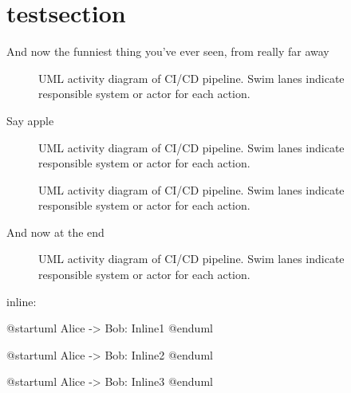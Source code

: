 \section{testsection}


And now the funniest thing you've ever seen, from really far away
\begin{figure} [H]
    \caption{UML activity diagram of CI/CD pipeline. Swim lanes indicate responsible system or actor for each action.}
    \label{test-diagram0}
\end{figure}
Say apple
\begin{figure} [H]
    \caption{UML activity diagram of CI/CD pipeline. Swim lanes indicate responsible system or actor for each action.}
    \label{cicd-diagram}
\end{figure}

\begin{figure} [H]
    \caption{UML activity diagram of CI/CD pipeline. Swim lanes indicate responsible system or actor for each action.}
    \label{cicd-diagram}
\end{figure}
And now at the end
\begin{figure} [H]
    \caption{UML activity diagram of CI/CD pipeline. Swim lanes indicate responsible system or actor for each action.}
    \label{test-diagram0}
\end{figure}

\newpage

inline:

\begin{plantuml}
  @startuml
  Alice -> Bob: Inline1
  @enduml
\end{plantuml}

\begin{plantuml}
  @startuml
  Alice -> Bob: Inline2
  @enduml
\end{plantuml}

\begin{plantuml}
  @startuml
  Alice -> Bob: Inline3
  @enduml
\end{plantuml}

